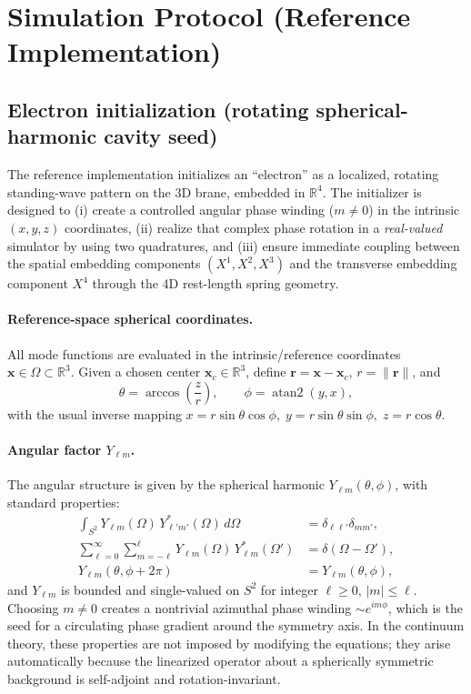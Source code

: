 \documentclass[11pt,a4paper]{article}
\newcommand{\R}{\mathbb{R}}
\newcommand{\x}{\mathbf{x}}                 %
\begin{document}
\section{Simulation Protocol (Reference Implementation)}
\label{sec:simulation}

\subsection{Electron initialization (rotating spherical-harmonic cavity seed)}
\label{subsec:electron_init}

The reference implementation initializes an ``electron'' as a localized, rotating standing-wave pattern on the 3D brane,
embedded in \(\R^4\). The initializer is designed to (i) create a controlled angular phase winding
(\(m\neq 0\)) in the intrinsic \((x,y,z)\) coordinates, (ii) realize that complex phase rotation in a
\emph{real-valued} simulator by using two quadratures, and (iii) ensure immediate coupling between the
spatial embedding components \((X^1,X^2,X^3)\) and the transverse embedding component \(X^4\) through
the 4D rest-length spring geometry.

\paragraph{Reference-space spherical coordinates.}
All mode functions are evaluated in the intrinsic/reference coordinates \(\x\in\Omega\subset\R^3\).
Given a chosen center \(\x_c\in\R^3\), define \(\mathbf{r}=\x-\x_c\), \(r=\|\mathbf{r}\|\), and
\[
\theta=\arccos\!\left(\frac{z}{r}\right),\qquad
\phi=\operatorname{atan2}(y,x),
\]
with the usual inverse mapping
\(
x=r\sin\theta\cos\phi,\;
y=r\sin\theta\sin\phi,\;
z=r\cos\theta.
\)

\paragraph{Angular factor \(Y_{\ell m}\).}
The angular structure is given by the spherical harmonic \(Y_{\ell m}(\theta,\phi)\), with standard
properties:
\begin{align}
\int_{S^2} Y_{\ell m}(\Omega)\,Y_{\ell' m'}^*(\Omega)\,d\Omega &= \delta_{\ell\ell'}\delta_{mm'},\\
\sum_{\ell=0}^{\infty}\sum_{m=-\ell}^{\ell} Y_{\ell m}(\Omega)\,Y_{\ell m}^*(\Omega')
&= \delta(\Omega-\Omega'),\\
Y_{\ell m}(\theta,\phi+2\pi) &= Y_{\ell m}(\theta,\phi),
\end{align}
and \(Y_{\ell m}\) is bounded and single-valued on \(S^2\) for integer \(\ell\ge 0\), \(|m|\le \ell\).
Choosing \(m\neq 0\) creates a nontrivial azimuthal phase winding \(\sim e^{im\phi}\), which is the
seed for a circulating phase gradient around the symmetry axis.
In the continuum theory, these properties are not imposed by modifying the equations; they arise automatically
because the linearized operator about a spherically symmetric background is self-adjoint and rotation-invariant.
\end{document}
